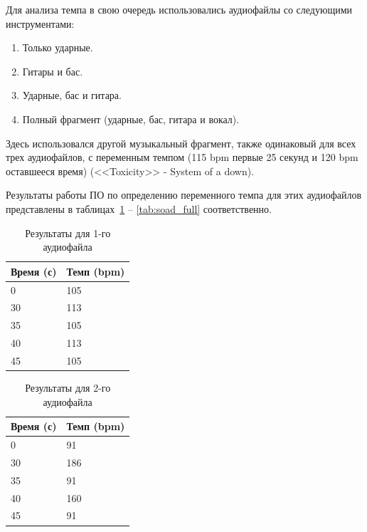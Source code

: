 Для анализа темпа в свою очередь использовались аудиофайлы со следующими инструментами:

\begin{enumerate}
	\item Только ударные.
	\item Гитары и бас.
	\item Ударные, бас и гитара.
	\item Полный фрагмент (ударные, бас, гитара и вокал).
\end{enumerate}

Здесь использовался другой музыкальный фрагмент, также одинаковый для всех трех аудиофайлов, с переменным темпом (115 bpm первые 25 секунд и 120 bpm оставшееся время) (<<Toxicity>> - System of a down).

Результаты работы ПО по определению переменного темпа для этих аудиофайлов представлены в таблицах~\ref{tab:soad_drums} -- \ref{tab:soad_full} соответственно.

\begin{table}[!h]
	\begin{center}
		\caption{\label{tab:soad_drums}Результаты для 1-го аудиофайла}
		\begin{tabular}{|p{8cm}|p{8cm}|}
			\hline
			Время (с) & Темп (bpm)\\
			\hline
			0 & 105\\
			\hline
			30 & 113\\
			\hline
			35 & 105\\
			\hline
			40 & 113\\
			\hline
			45 & 105\\
			\hline
		\end{tabular}
	\end{center}
\end{table}

\begin{table}[!h]
	\begin{center}
		\caption{\label{tab:soad_guitar}Результаты для 2-го аудиофайла}
		\begin{tabular}{|p{8cm}|p{8cm}|}
			\hline
			Время (с) & Темп (bpm)\\
			\hline
			0 & 91\\
			\hline
			30 & 186\\
			\hline
			35 & 91\\
			\hline
			40 & 160\\
			\hline
			45 & 91\\
			\hline
		\end{tabular}
	\end{center}
\end{table}

